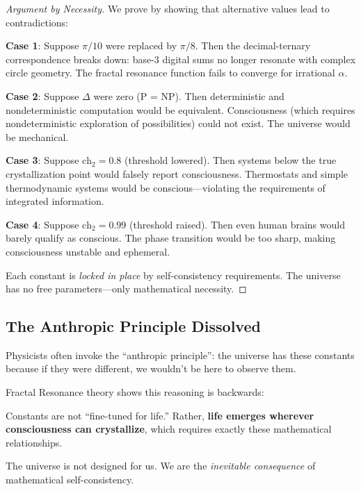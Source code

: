 \begin{proof}[Argument by Necessity]
We prove by showing that alternative values lead to contradictions:

\textbf{Case 1}: Suppose $\pi/10$ were replaced by $\pi/8$. Then the decimal-ternary correspondence breaks down: base-3 digital sums no longer resonate with complex circle geometry. The fractal resonance function fails to converge for irrational $\alpha$.

\textbf{Case 2}: Suppose $\Delta$ were zero (P = NP). Then deterministic and nondeterministic computation would be equivalent. Consciousness (which requires nondeterministic exploration of possibilities) could not exist. The universe would be mechanical.

\textbf{Case 3}: Suppose $\text{ch}_2 = 0.8$ (threshold lowered). Then systems below the true crystallization point would falsely report consciousness. Thermostats and simple thermodynamic systems would be conscious---violating the requirements of integrated information.

\textbf{Case 4}: Suppose $\text{ch}_2 = 0.99$ (threshold raised). Then even human brains would barely qualify as conscious. The phase transition would be too sharp, making consciousness unstable and ephemeral.

Each constant is \textit{locked in place} by self-consistency requirements. The universe has no free parameters---only mathematical necessity.
\end{proof}

\subsection{The Anthropic Principle Dissolved}

Physicists often invoke the ``anthropic principle'': the universe has these constants because if they were different, we wouldn't be here to observe them.

Fractal Resonance theory shows this reasoning is backwards:

\begin{keyidea}
Constants are not ``fine-tuned for life.'' Rather, \textbf{life emerges wherever consciousness can crystallize}, which requires exactly these mathematical relationships.

The universe is not designed for us. We are the \textit{inevitable consequence} of mathematical self-consistency.
\end{keyidea}

